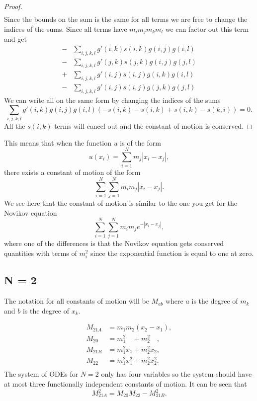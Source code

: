 \documentclass[english,master]{liumaiex}
\theoremstyle{plain}
\theoremstyle{definition}
\begin{document}
\begin{proof}
\begin{equation}
\begin{aligned}
	\end{aligned}
	\end{equation}
	Since the bounds on the sum is the same for all terms we are free to change the indices of the sums. Since all terms have $m_i m_j m_k m_l$ we can factor out this term and get
	\begin{equation}
	\begin{aligned}
		-&\sum_{i,j,k,l} g'(i,k)s(i,k)g(i,j)g(i,l) \\
		-&\sum_{i,j,k,l} g'(j,k)s(j,k)g(i,j)g(j,l) \\
		+&\sum_{i,j,k,l} g'(i,j)s(i,j)g(i,k)g(i,l) \\
		-&\sum_{i,j,k,l} g'(i,j)s(i,j)g(j,k)g(j,l)
	\end{aligned}
	\end{equation}
	We can write all on the same form by changing the indices of the sums
	\begin{equation}
		\sum_{i,j,k,l} g'(i,k)g(i,j)g(i,l) (- s(i,k) - s(i,k) + s(i,k) - s(k,i)) = 0.
	\end{equation}
	All the $s(i,k)$ terms will cancel out and the constant of motion is conserved.
\end{proof}

This means that when the function $u$ is of the form 
\begin{equation}
	u(x_i) = \sum_{i=1}^{N} m_j |x_i - x_j|,
\end{equation}
there exists a constant of motion of the form
\begin{equation}
	\sum_{i=1}^{N}\sum_{j=1}^N m_i m_j |x_i - x_j|.
\end{equation}
We see here that the constant of motion is similar to the one you get for the Novikov equation
\begin{equation}
	\sum_{i=1}^{N}\sum_{j=1}^N m_i m_j e^{-|x_i - x_j|},
\end{equation}
where one of the differences is that the Novikov equation gets conserved quantities with terms of $m_i^2$ since the exponential function is equal to one at zero.

\subsection*{N = 2}

The notation for all constants of motion will be $M_{ab}$ where $a$ is the degree of $m_k$ and $b$ is the degree of $x_k$.

\begin{align}
	M_{21A} &= m_1 m_2 (x_2 - x_1), \\
	M_{20\phantom{A}} &= m_1^2\phantom{x_1} + m_2^2\phantom{x_2}, \\
	M_{21B} &= m_1^2 x_1 + m_2^2 x_2, \\
	M_{22\phantom{A}} &= m_1^2 x_1^2 + m_2^2 x_2^2. \\
\end{align}
%
The system of ODEs for $N = 2$ only has four variables so the system should have at most three functionally independent constants of motion. It can be seen that
\begin{equation}
	M_{21A}^2 = M_{20}M_{22} - M_{21B}^2.
\end{equation}
\end{document}
